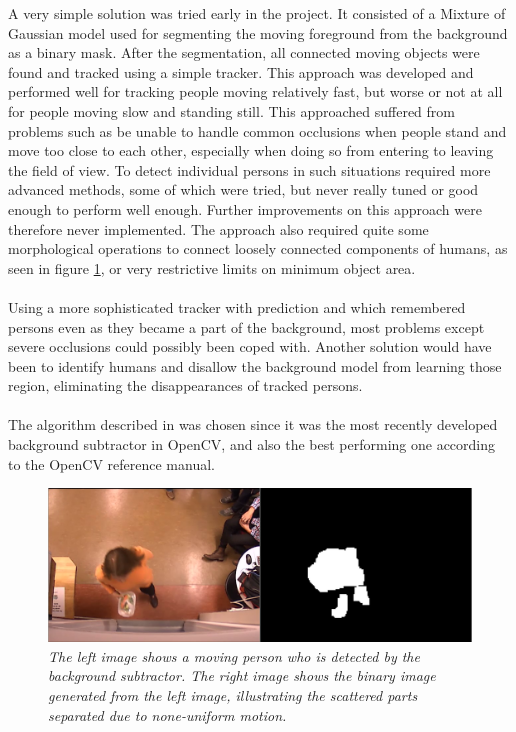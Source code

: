 
A very simple solution was tried early in the project. It consisted of a Mixture of Gaussian model \cite{Gardel} used for segmenting the moving foreground from the background as a binary mask. After the segmentation, all connected moving objects were found and tracked using a simple tracker. This approach was developed and performed well for tracking people moving relatively fast, but worse or not at all for people moving slow and standing still. This approached suffered from problems such as be unable to handle common occlusions when people stand and move too close to each other, especially when doing so from entering to leaving the field of view. To detect individual persons in such situations required more advanced methods, some of which were tried, but never really tuned or good enough to perform well enough. Further improvements on this approach were therefore never implemented. The approach also required quite some morphological operations to connect loosely connected components of humans, as seen in figure \ref{fig:bg_success}, or very restrictive limits on minimum object area.\\
\\
Using a more sophisticated tracker with prediction and which remembered persons even as they became a part of the background, most problems except severe occlusions could possibly been coped with. Another solution would have been to identify humans and disallow the background model from learning those region, eliminating the disappearances of tracked persons. \\
\\
The algorithm described in \cite{Gardel} was chosen since it was the most recently developed background subtractor in OpenCV, and also the best performing one according to the OpenCV reference manual. 


\vspace{1cm}
\begin{figure}[htb]
	\centering
	\includegraphics[width=\linewidth]{images/bg_success.png}
	\caption[An example of scattered binary mask of a human from the background model.]{\textit{The left image shows a moving person who is detected by the background subtractor. The right image shows the binary image generated from the left image, illustrating the scattered parts separated due to none-uniform motion.
	}}
	\label{fig:bg_success}  %
\end{figure}

